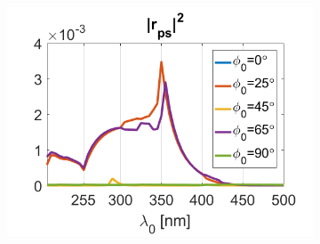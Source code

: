 \begin{figure}[htb!]
\begin{subfigure}{0.32\textwidth}
        \centering
        \includegraphics[width=\linewidth]{figures/ch4/S5A/FieldDistribution/phi0-90/S5A_rps_phi0-90.png}
   \end{subfigure}
   \vspace{0.7cm}
   

\end{figure}
